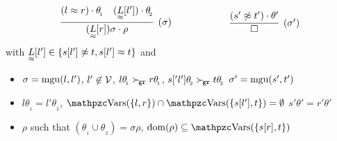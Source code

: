    \begin{definition}\label{def:unit:superposition:on:closures}
    \begin{gather*}
        \infer[(\sigma)]
        {(\underset{\mEQ}{L}[r])\sigma\cdot\rho}
        {(l\mEQ r)\cdot\theta_{\!_1} & (\underset{\mEQ}{L}[l'])\cdot\theta_{\!_2}}
    \qquad\qquad\qquad
        \infer[(\sigma')]
        {\emptyclause}
        {(s'\mNE t')\cdot\theta'}
    \end{gather*}
    with \( \underset{\approx}{L}[l'] \in \{ s[l']\not\approx t, s[l']\approx t \} \) and
    \begin{itemize}
        \item
        \( \sigma = \operatorname{mgu}(l,l') \),
        \( l'\not\in\mathcal{V} \),
        \( l\theta_{\!_1} \mathrel\succ_{\!\mathtt{gr}} r\theta_{\!_1} \),
        \( s['l']\theta_{\!_2} \mathrel\succ_{\!\mathtt{gr}} t\theta_{\!_2} \)
        \hfill \( \sigma' = \operatorname{mgu}(s',t') \)
        \item
        \( l\theta_{\!_1} = l'\theta_{\!_2} \),
        \( \var(\{l,r\}) \cap \var(\{ s[l'],t \}) = \emptyset \)
        \hfill \( s'\theta' = r'\theta' \)
        \item
        \( \rho \) such that
        \( (\theta_{\!_1}\cup\theta_{\!_2}) = \sigma\rho \),
        \( \domain(\rho) \subseteq \var(\{ s[r],t \}) \)
    \end{itemize}
   \end{definition}


